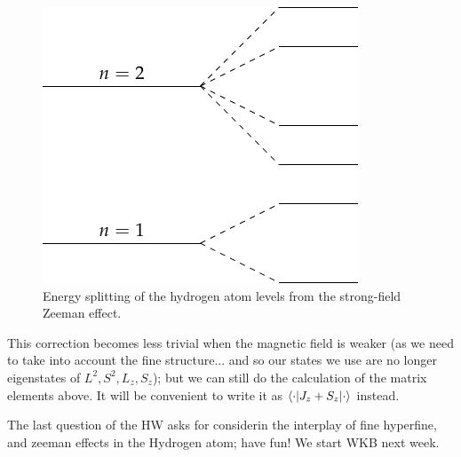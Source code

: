 \begin{figure}[htbp]
    \centering
    \includegraphics[]{Images/fig-strongzeemaneffectsplit.pdf}

    \caption{Energy splitting of the hydrogen atom levels from the strong-field Zeeman effect.}
    \label{fig-strongzeemaneffectsplit}
\end{figure}

This correction becomes less trivial when the magnetic field is weaker (as we need to take into account the fine structure... and so our states we use are no longer eigenstates of $L^2, S^2, L_z, S_z$); but we can still do the calculation of the matrix elements above. It will be convenient to write it as $\langle \cdot \rvert J_z + S_z\lvert \cdot \rangle$ instead.

The last question of the HW asks for considerin the interplay of fine hyperfine, and zeeman effects in the Hydrogen atom; have fun! We start WKB next week.